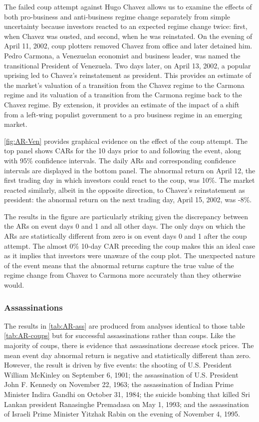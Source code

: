\documentclass[12pt,final,fleqn]{article}
\theoremstyle{plain}
\begin{document}
The failed coup attempt against Hugo Chavez allows us to examine the effects of both pro-business and anti-business regime change separately from simple uncertainty because investors reacted to an expected regime change twice: first, when Chavez was ousted, and second, when he was reinstated. On the evening of April 11, 2002, coup plotters removed Chavez from office and later detained him. Pedro Carmona, a Venezuelan economist and business leader, was named the transitional President of Venezuela. Two days later, on April 13, 2002, a popular uprising led to Chavez's reinstatement as president. This provides an estimate of the market's valuation of a transition from the Chavez regime to the Carmona regime and its valuation of a transition from the Carmona regime back to the Chavez regime. By extension, it provides an estimate of the impact of a shift from a left-wing populist government to a pro business regime in an emerging market.

\autoref{fig:AR-Ven} provides graphical evidence on the effect of the coup attempt. The top panel shows CARs for the 10 days prior to and following the event, along with 95\% confidence intervals. The daily ARs and corresponding confidence intervals are displayed in the bottom panel. The abnormal return on April 12, the first trading day in which investors could react to the coup, was 10\%. The market reacted similarly, albeit in the opposite direction, to Chavez's reinstatement as president: the abnormal return on the next trading day, April 15, 2002, was -8\%.

The results in the figure are particularly striking given the discrepancy between the ARs on event days 0 and 1 and all other days. The only days on which the ARs are statistically different from zero is on event days 0 and 1 after the coup attempt. The almost 0\% 10-day CAR preceding the coup makes this an ideal case as it implies that investors were unaware of the coup plot. The unexpected nature of the event means that the abnormal returns capture the true value of the regime change from Chavez to Carmona more accurately than they otherwise would.

\subsubsection{Assassinations} \label{subsec: Assassinations}

The results in \autoref{tab:AR-ass} are produced from analyses identical to those table \autoref{tab:AR-coups} but for successful assassinations rather than coups. Like the majority of coups, there is evidence that assassinations decrease stock prices. The mean event day abnormal return is negative and statistically different than zero. However, the result is driven by five events: the shooting of U.S. President William McKinley on September 6, 1901; the assassination of U.S. President John F. Kennedy on November 22, 1963; the assassination of Indian Prime Minister Indira Gandhi on October 31, 1984; the suicide bombing that killed Sri Lankan president Ranasinghe Premadasa on May 1, 1993; and the assassination of Israeli Prime Minister Yitzhak Rabin on the evening of November 4, 1995.
\end{document}
